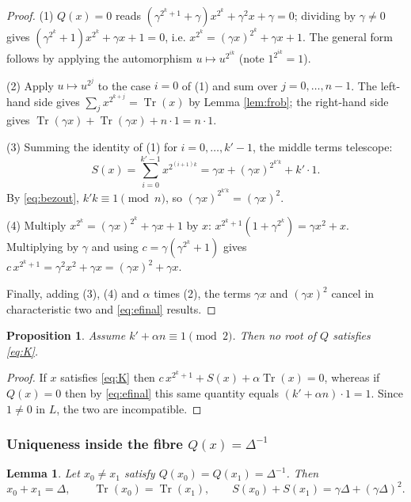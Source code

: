 \documentclass[11pt,a4paper]{article}
\newtheorem{proposition}[theorem]{Proposition}
\newtheorem{lemma}[theorem]{Lemma}
\theoremstyle{definition}
\newcommand{\Tr}{\operatorname{Tr}}
\begin{document}
\begin{proof}
(1) $Q(x)=0$ reads $(\gamma^{2^{k}+1}+\gamma)x^{2^{k}}+\gamma^{2}x+\gamma=0$;
dividing by $\gamma\neq0$ gives
$(\gamma^{2^{k}}+1)x^{2^{k}}+\gamma x+1=0$, i.e.
$x^{2^{k}}=(\gamma x)^{2^{k}}+\gamma x+1$.  The general form follows by applying
the automorphism $u\mapsto u^{2^{ik}}$ (note $1^{2^{ik}}=1$).

(2) Apply $u\mapsto u^{2^{j}}$ to the case $i=0$ of (1) and sum over
$j=0,\dots,n-1$.  The left-hand side gives $\sum_{j}x^{2^{k+j}}=\Tr(x)$ by Lemma
\ref{lem:frob}; the right-hand side gives
$\Tr(\gamma x)+\Tr(\gamma x)+n\cdot1=n\cdot1$.

(3) Summing the identity of (1) for $i=0,\dots,k'-1$, the middle terms telescope:
\[
  S(x)=\sum_{i=0}^{k'-1}x^{2^{(i+1)k}}
      =\gamma x+(\gamma x)^{2^{k'k}}+k'\cdot 1 .
\]
By \eqref{eq:bezout}, $k'k\equiv1\pmod n$, so $(\gamma x)^{2^{k'k}}=(\gamma x)^{2}$.

(4) Multiply $x^{2^{k}}=(\gamma x)^{2^{k}}+\gamma x+1$ by $x$:
$x^{2^{k}+1}(1+\gamma^{2^{k}})=\gamma x^{2}+x$.  Multiplying by $\gamma$ and using
$c=\gamma(\gamma^{2^{k}}+1)$ gives
$c\,x^{2^{k}+1}=\gamma^{2}x^{2}+\gamma x=(\gamma x)^{2}+\gamma x$.

Finally, adding (3), (4) and $\alpha$ times (2), the terms $\gamma x$ and
$(\gamma x)^{2}$ cancel in characteristic two and \eqref{eq:efinal} results.
\end{proof}

\begin{proposition}\label{prop:noQzero}
Assume $k'+\alpha n\equiv1\pmod2$.  Then no root of $Q$ satisfies \eqref{eq:K}.
\end{proposition}

\begin{proof}
If $x$ satisfies \eqref{eq:K} then $c\,x^{2^{k}+1}+S(x)+\alpha\Tr(x)=0$, whereas
if $Q(x)=0$ then by \eqref{eq:efinal} this same quantity equals
$(k'+\alpha n)\cdot1=1$.  Since $1\neq0$ in $L$, the two are incompatible.
\end{proof}

\subsubsection{Uniqueness inside the fibre $Q(x)=\Delta^{-1}$}

\begin{lemma}\label{lem:pairsum}
Let $x_0\neq x_1$ satisfy $Q(x_0)=Q(x_1)=\Delta^{-1}$.  Then
\[
  x_0+x_1=\Delta,\qquad \Tr(x_0)=\Tr(x_1),\qquad S(x_0)+S(x_1)=\gamma\Delta+(\gamma\Delta)^{2}.
\]
\end{lemma}
\end{document}
